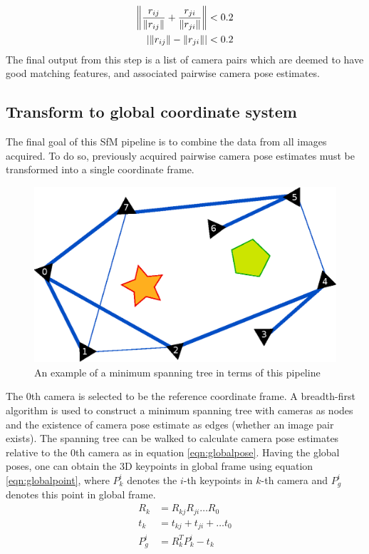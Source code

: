 \documentclass[10pt,twocolumn,letterpaper]{article}
\newcommand{\norm}[1]{\left\lVert #1 \right\rVert}
\DeclarePairedDelimiter\abs{\lvert}{\rvert}
\begin{document}
\begin{align}
\norm{\frac{r_{ij}}{\norm{r_{ij}}} + \frac{r_{ji}}{\norm{r_{ji}}}} < 0.2
\label{eqn:check1}\\
\abs{\norm{r_{ij}} - \norm{r_{ji}}} < 0.2\label{eqn:check2}
\end{align}
The final output from this step is a list of camera pairs which are deemed to
have good matching features, and associated pairwise camera pose estimates.



\subsection{Transform to global coordinate system}

The final goal of this SfM pipeline is to combine the data from all images
acquired. To do so, previously acquired pairwise camera pose estimates must
be transformed into a single coordinate frame.

\begin{figure}[t]
\begin{center}
   \includegraphics[width=0.9\linewidth]{figures/spanning_tree.eps}
\end{center}
\caption{An example of a minimum spanning tree in terms of this pipeline}
\label{fig:spanning}
\end{figure}

The 0th camera is selected to be the reference coordinate frame. A breadth-first
algorithm is used to construct a minimum spanning tree with cameras as nodes and
the existence of camera pose estimate as edges (whether an image pair exists).
The spanning tree can be walked to calculate camera pose estimates relative to
the 0th camera as in equation \ref{eqn:globalpose}. Having the global poses, one can obtain the 3D keypoints in global frame using equation \ref{eqn:globalpoint}, where $P^{i}_{k}$ denotes the $i$-th keypoints in $k$-th camera and $P^{i}_{g}$ denotes this point in global frame.
\begin{align}\label{eqn:globalpose}
R_{k} &= R_{kj}R_{ji}\ldots R_{0}\nonumber\\
t_{k} &= t_{kj}+t_{ji}+\ldots t_{0}\\
P^{i}_{g} &= R_{k}^T P^{i}_{k} - t_{k} \label{eqn:globalpoint}
\end{align}
\end{document}
